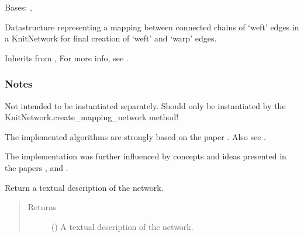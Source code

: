 \documentclass[letterpaper,10pt,english]{sphinxmanual}
\begin{document}
\begin{fulllineitems}
\label{\detokenize{cockatoo:cockatoo.KnitMappingNetwork}}
Bases: , 

Datastructure representing a mapping between connected chains of ‘weft’
edges in a KnitNetwork for final creation of ‘weft’ and ‘warp’ edges.

Inherits from , {\hyperref[\detokenize{cockatoo:cockatoo.KnitNetworkBase}]{}}
For more info, see  \sphinxfootnotemark[13].
\subsubsection*{Notes}

Not intended to be instantiated separately. Should only be instantiated
by the KnitNetwork.create\_mapping\_network method!

The implemented algorithms are strongly based on the paper
 \sphinxfootnotemark[1].
Also see  \sphinxfootnotemark[2].

The implementation was further influenced by concepts and ideas presented
in the papers  \sphinxfootnotemark[3],
 \sphinxfootnotemark[4] and
 \sphinxfootnotemark[5].

\begin{fulllineitems}
\label{\detokenize{cockatoo:cockatoo.KnitMappingNetwork.ToString}}
Return a textual description of the network.
\begin{quote}\begin{description}
\item[{Returns}] \leavevmode
{} () \textendash{} A textual description of the network.


\end{description}
\end{quote}
\end{fulllineitems}
\end{fulllineitems}
\end{document}
